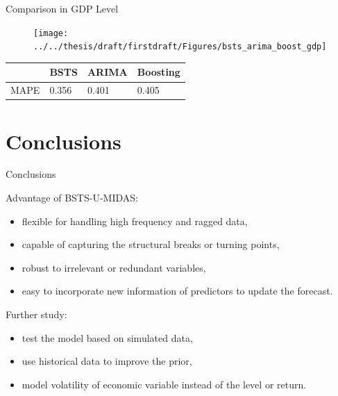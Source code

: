 \documentclass[14pt,xcolor=dvipsnames]{beamer}
\begin{document}
\begin{frame}{Comparison in GDP Level}
\begin{figure}
\centering
\texttt{[image: ../../thesis/draft/firstdraft/Figures/bsts\_arima\_boost\_gdp]}
\label{fig:bsts_arima_boost_gdp}
\end{figure}
\begin{table}[h]
	\centering
	\begin{tabular}{@{}llll@{}}
		\toprule
		& BSTS   & ARIMA    & Boosting   \\ 
		\midrule
		MAPE     & 0.356 &0.401 & 0.405  \\
		\bottomrule
	\end{tabular}
\end{table}
\end{frame}




\section{Conclusions}



\begin{frame}{Conclusions}
	
Advantage of BSTS-U-MIDAS:
\begin{itemize}
	\item flexible for handling high frequency and ragged
	data,
	\item capable of capturing the structural breaks or	turning points,
	\item robust to irrelevant or redundant	variables,
	\item easy to incorporate new information of predictors to update the forecast.
\end{itemize}
Further study:
\begin{itemize}
	\item test the model based on simulated data,
	\item use historical data to improve the prior,
	\item model volatility of economic variable instead of the level or return. 

\end{itemize}
\end{frame}
\end{document}
